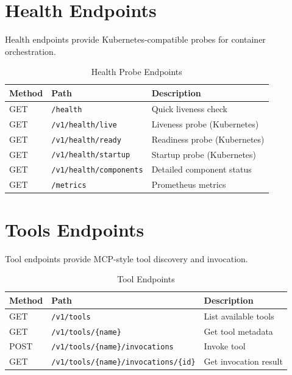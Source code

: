 \section{Health Endpoints}
\label{app:api:health}

Health endpoints provide Kubernetes-compatible probes for container orchestration.

\begin{table}[ht]
\centering
\caption{Health Probe Endpoints}
\label{tab:health-endpoints}
\small
\begin{tabularx}{\textwidth}{llX}
    \hline
    \textbf{Method} & \textbf{Path} & \textbf{Description} \\
    \hline
    GET & \texttt{/health} & Quick liveness check \\
    GET & \texttt{/v1/health/live} & Liveness probe (Kubernetes) \\
    GET & \texttt{/v1/health/ready} & Readiness probe (Kubernetes) \\
    GET & \texttt{/v1/health/startup} & Startup probe (Kubernetes) \\
    GET & \texttt{/v1/health/components} & Detailed component status \\
    GET & \texttt{/metrics} & Prometheus metrics \\
    \hline
\end{tabularx}
\end{table}

\section{Tools Endpoints}
\label{app:api:tools}

Tool endpoints provide MCP-style tool discovery and invocation.

\begin{table}[ht]
\centering
\caption{Tool Endpoints}
\label{tab:tool-endpoints}
\small
\begin{tabularx}{\textwidth}{llX}
    \hline
    \textbf{Method} & \textbf{Path} & \textbf{Description} \\
    \hline
    GET & \texttt{/v1/tools} & List available tools \\
    GET & \texttt{/v1/tools/\{name\}} & Get tool metadata \\
    POST & \texttt{/v1/tools/\{name\}/invocations} & Invoke tool \\
    GET & \texttt{/v1/tools/\{name\}/invocations/\{id\}} & Get invocation result \\
    \hline
\end{tabularx}
\end{table}


